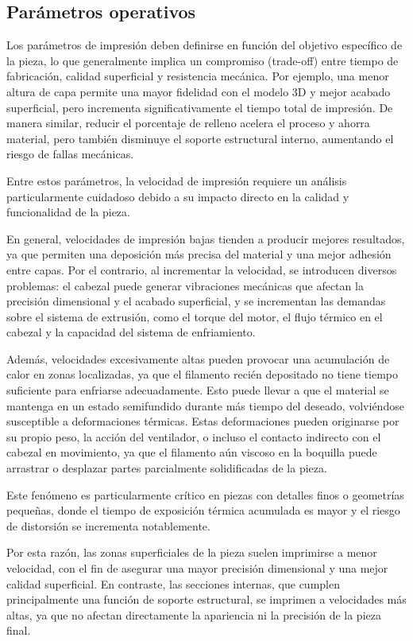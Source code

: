 \subsection{Parámetros operativos}

Los parámetros de impresión deben definirse en función del objetivo específico de la pieza, lo que generalmente implica un compromiso (trade-off) entre tiempo de fabricación, calidad superficial y resistencia mecánica. Por ejemplo, una menor altura de capa permite una mayor fidelidad con el modelo 3D y mejor acabado superficial, pero incrementa significativamente el tiempo total de impresión. De manera similar, reducir el porcentaje de relleno acelera el proceso y ahorra material, pero también disminuye el soporte estructural interno, aumentando el riesgo de fallas mecánicas.

Entre estos parámetros, la velocidad de impresión requiere un análisis particularmente cuidadoso debido a su impacto directo en la calidad y funcionalidad de la pieza.

En general, velocidades de impresión bajas tienden a producir mejores resultados, ya que permiten una deposición más precisa del material y una mejor adhesión entre capas. Por el contrario, al incrementar la velocidad, se introducen diversos problemas: el cabezal puede generar vibraciones mecánicas que afectan la precisión dimensional y el acabado superficial, y se incrementan las demandas sobre el sistema de extrusión, como el torque del motor, el flujo térmico en el cabezal y la capacidad del sistema de enfriamiento.

Además, velocidades excesivamente altas pueden provocar una acumulación de calor en zonas localizadas, ya que el filamento recién depositado no tiene tiempo suficiente para enfriarse adecuadamente. Esto puede llevar a que el material se mantenga en un estado semifundido durante más tiempo del deseado, volviéndose susceptible a deformaciones térmicas. Estas deformaciones pueden originarse por su propio peso, la acción del ventilador, o incluso el contacto indirecto con el cabezal en movimiento, ya que el filamento aún viscoso en la boquilla puede arrastrar o desplazar partes parcialmente solidificadas de la pieza.

Este fenómeno es particularmente crítico en piezas con detalles finos o geometrías pequeñas, donde el tiempo de exposición térmica acumulada es mayor y el riesgo de distorsión se incrementa notablemente.

Por esta razón, las zonas superficiales de la pieza suelen imprimirse a menor velocidad, con el fin de asegurar una mayor precisión dimensional y una mejor calidad superficial. En contraste, las secciones internas, que cumplen principalmente una función de soporte estructural, se imprimen a velocidades más altas, ya que no afectan directamente la apariencia ni la precisión de la pieza final.

